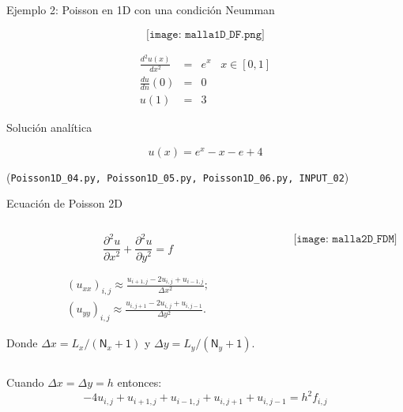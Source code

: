 \documentclass[handout]{beamer}
\begin{document}
\begin{frame}{Ejemplo 2: Poisson en 1D con una condici\'on Neumman}
	
{\small 	
$$\texttt{[image: malla1D\_DF.png]}$$
	
	\begin{eqnarray*}
		\frac{d^2 u(x)}{d x^2} & = & e^x \,\,\,\,\, x \in [0,1] \\
	     \frac{du}{d n}(0) & = & 0 \\
		u(1) & = & 3
	\end{eqnarray*}
	
	Soluci\'on anal\'itica
	
	\[
	u(x) = e^x - x - e + 4
	\]

(\texttt{Poisson1D\_04.py, Poisson1D\_05.py, Poisson1D\_06.py, INPUT\_02})	
}
\end{frame}


\begin{frame}{Ecuaci\'on de Poisson 2D}

\begin{columns}
\begin{column}{0.60\textwidth}
\[
\frac{\partial^2 u}{\partial x^2} + \frac{\partial^2 u}{\partial y^2} = f
\]

\pause

\begin{eqnarray*}
(u_{xx})_{i,j} \approx \frac{u_{i+1,j} - 2 u_{i,j} + u_{i-1,j}}{\Delta x^2}; \\
(u_{yy})_{i,j} \approx \frac{u_{i,j+1} - 2 u_{i,j} + u_{i,j-1}}{\Delta y^2}.
\end{eqnarray*}
\begin{small}
Donde $\Delta x = L_x / (\textsf{N}_x + \textsf{1})$ y $\Delta y = L_y / (\textsf{N}_y + \textsf{1})$. 
\end{small}\end{column}
\begin{column}{0.40\textwidth}
$$\texttt{[image: malla2D\_FDM]}$$
\end{column}
\end{columns}

\pause

Cuando $\Delta x = \Delta y = h$ entonces:
  \[
  \boxed{-4u_{i,j} +  u_{i+1,j} + u_{i-1,j} + u_{i,j+1} + u_{i,j-1} = h^2 f_{i,j}}
  \]
\end{frame}
\end{document}
